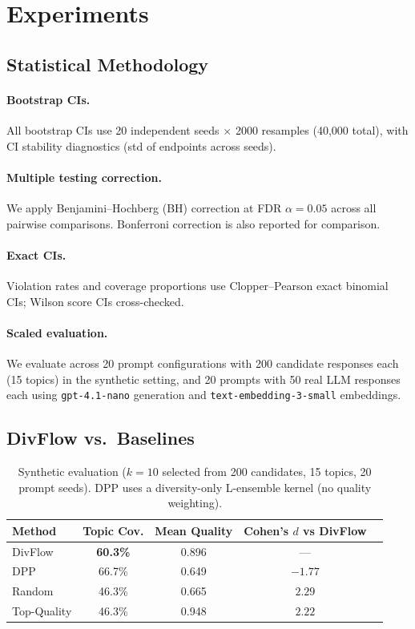 \documentclass[10pt]{article}
\begin{document}
\section{Experiments}
\label{sec:experiments}

\subsection{Statistical Methodology}

\paragraph{Bootstrap CIs.} All bootstrap CIs use 20 independent seeds $\times$ 2000 resamples (40{,}000 total), with CI stability diagnostics (std of endpoints across seeds).

\paragraph{Multiple testing correction.} We apply Benjamini--Hochberg (BH) correction at FDR $\alpha = 0.05$ across all pairwise comparisons. Bonferroni correction is also reported for comparison.

\paragraph{Exact CIs.} Violation rates and coverage proportions use Clopper--Pearson exact binomial CIs; Wilson score CIs cross-checked.

\paragraph{Scaled evaluation.} We evaluate across 20 prompt configurations with 200 candidate responses each (15 topics) in the synthetic setting, and 20 prompts with 50 real LLM responses each using \texttt{gpt-4.1-nano} generation and \texttt{text-embedding-3-small} embeddings.

\subsection{DivFlow vs.\ Baselines}

\begin{table}[t]
\centering
\caption{Synthetic evaluation ($k=10$ selected from 200 candidates, 15 topics, 20 prompt seeds). DPP uses a diversity-only L-ensemble kernel (no quality weighting).}
\label{tab:main}
\small
\begin{tabular}{lcccc}
\toprule
\textbf{Method} & \textbf{Topic Cov.} & \textbf{Mean Quality} & \textbf{Cohen's $d$ vs DivFlow} \\
\midrule
DivFlow      & \textbf{60.3\%} & 0.896 & --- \\
DPP          & 66.7\%          & 0.649 & $-1.77$ \\
Random       & 46.3\%          & 0.665 & $2.29$ \\
Top-Quality  & 46.3\%          & 0.948 & $2.22$ \\
\bottomrule
\end{tabular}
\end{table}
\end{document}

